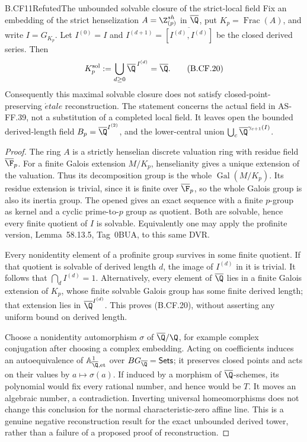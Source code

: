 \begin{claim}{B.CF11}{Refuted}{The unbounded solvable closure of the strict-local field}
Fix an embedding of the strict henselization
\(A=\Z_{(p)}^{sh}\) in \(\overline\Q\), put
\(K_p=\operatorname{Frac}(A)\), and write \(I=G_{K_p}\).
Let \(I^{(0)}=I\) and
\(I^{(d+1)}=\overline{[I^{(d)},I^{(d)}]}\) be the closed
derived series. Then
\[
 K_p^{\mathrm{sol}}
   :=\bigcup_{d\geq 0}\overline\Q^{\,I^{(d)}}
   =\overline\Q.                                      \tag{B.CF.20}
\]
Consequently this maximal solvable closure does not satisfy
closed-point-preserving \(\acute etale\) reconstruction. The statement
concerns the actual field in AS-FF.39, not a substitution of a
completed local field. It leaves open the bounded derived-length
field \(B_p=\overline\Q^{I^{(2)}}\), and the lower-central union
\(\bigcup_c\overline\Q^{\gamma_{c+1}(I)}\).
\end{claim}
\begin{proof}
The ring \(A\) is a strictly henselian discrete valuation ring
with residue field \(\overline{\F}_p\). For a finite Galois
extension \(M/K_p\), henselianity gives a unique extension of
the valuation. Thus its decomposition group is the whole
\(\operatorname{Gal}(M/K_p)\). Its residue extension is trivial,
since it is finite over \(\overline{\F}_p\), so the whole
Galois group is also its inertia group. The opened
\citep[Lemma~15.114.5, Tag~09EE]{StacksProject} gives an exact
sequence with a finite \(p\)-group as kernel and a cyclic
prime-to-\(p\) group as quotient. Both are solvable, hence every
finite quotient of \(I\) is solvable. Equivalently one may apply
the profinite version, Lemma~58.13.5, Tag~0BUA, to this same DVR.

Every nonidentity element of a profinite group survives in some
finite quotient. If that quotient is solvable of derived length
\(d\), the image of \(I^{(d)}\) in it is trivial. It follows
that \(\bigcap_d I^{(d)}=1\). Alternatively, every element of
\(\overline\Q\) lies in a finite Galois extension of \(K_p\),
whose finite solvable Galois group has some finite derived length;
that extension lies in \(\overline\Q^{I^{(d)}}\). This proves
(B.CF.20), without asserting any uniform bound on derived length.

Choose a nonidentity automorphism \(\sigma\) of
\(\overline\Q/\Q\), for example complex conjugation after
choosing a complex embedding. Acting on coefficients induces an
autoequivalence of \(\mathbb A^1_{\overline\Q,\mathrm{et}}\)
over \(B G_{\overline\Q}=\mathsf{Sets}\); it preserves closed
points and acts on their values by \(a\mapsto\sigma(a)\).
If induced by a morphism of \(\overline\Q\)-schemes, its
polynomial would fix every rational number, and hence would be
\(T\). It moves an algebraic number, a contradiction. Inverting
universal homeomorphisms does not change this conclusion for the
normal characteristic-zero affine line. This is a genuine
negative reconstruction result for the exact unbounded derived
tower, rather than a failure of a proposed proof of reconstruction.
\end{proof}
